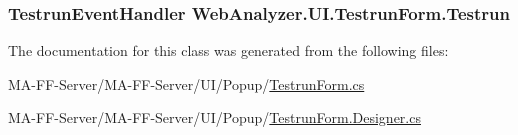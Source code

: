 \subsubsection[{Testrun}]{\setlength{\rightskip}{0pt plus 5cm}Testrun\+Event\+Handler Web\+Analyzer.\+U\+I.\+Testrun\+Form.\+Testrun}\label{class_web_analyzer_1_1_u_i_1_1_testrun_form_ac07b8e3d6b66e219b067dcacd1535f2c}


The documentation for this class was generated from the following files\+:\begin{DoxyCompactItemize}
\item 
M\+A-\/\+F\+F-\/\+Server/\+M\+A-\/\+F\+F-\/\+Server/\+U\+I/\+Popup/\hyperlink{_testrun_form_8cs}{Testrun\+Form.\+cs}\item 
M\+A-\/\+F\+F-\/\+Server/\+M\+A-\/\+F\+F-\/\+Server/\+U\+I/\+Popup/\hyperlink{_testrun_form_8_designer_8cs}{Testrun\+Form.\+Designer.\+cs}\end{DoxyCompactItemize}
